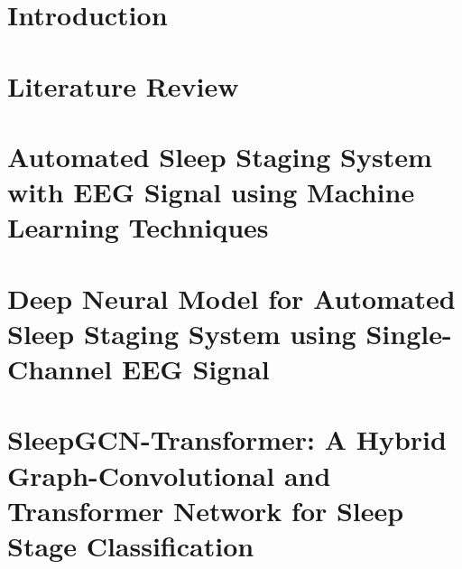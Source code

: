 \documentclass[12pt,a4paper]{report}
\begin{document}
	\pagestyle{plain}\clearpage
        \thispagestyle{empty}
	
		
	\thispagestyle{empty}

         \pagestyle{plain}\clearpage
        \thispagestyle{empty}
	
      



        
	\thispagestyle{empty}
	
	\clearpage\thispagestyle{empty}

\clearpage\thispagestyle{empty}

 
	
	\thispagestyle{empty}
	
        	\tableofcontents
	\listoffigures
	\listoftables
 
    
	\cleardoublepage{}
	\pagestyle{fancy}


\chapter{Introduction}
\label{chapter1}


\chapter{Literature Review}
\label{chapter2}


\chapter{Automated Sleep Staging System with EEG Signal using Machine Learning Techniques}
\label{chapter_paper1}


\chapter{Deep Neural Model for Automated Sleep Staging System using Single-Channel EEG Signal}
\label{chapter_paper2}


\chapter{SleepGCN-Transformer: A Hybrid Graph-Convolutional and Transformer Network for Sleep Stage Classification}
\label{chapter_paper3}

\end{document}
